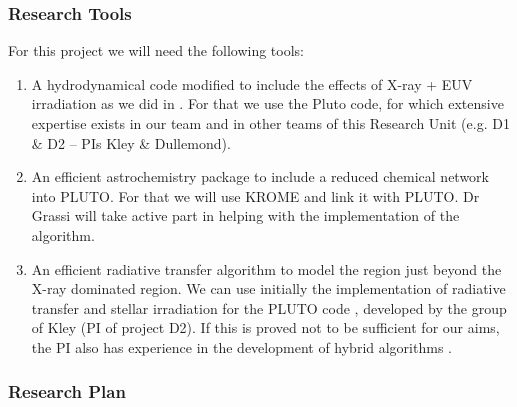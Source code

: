 \documentclass[10pt,fleqn,twoside]{article}
\begin{document}
\subsubsection{Research Tools}

For this project we will need the following tools: 
\begin{enumerate}
\item A hydrodynamical code modified to include the
  effects of X-ray + EUV irradiation as we did in 
  \citet{2010MNRAS.401.1415O}.
  For
  that we use the Pluto code, for which extensive expertise
  exists in our team and in other teams of this Research Unit (e.g. D1
  \& D2 -- PIs Kley \& Dullemond).
\item An efficient astrochemistry package to include a reduced
  chemical network into PLUTO. For that we will use KROME 
  \citep{2014MNRAS.439.2386G}  
and link it with PLUTO. Dr Grassi will take active part in helping
with the implementation of the algorithm.
\item An efficient radiative transfer algorithm to model the region
  just beyond the X-ray dominated region. We can use initially the
  implementation of radiative transfer and stellar irradiation
for the PLUTO code 
\citep{2013A&A...559A..80K},
developed by the group of Kley
(PI of project D2). If this is proved not to be sufficient for our
aims, the PI also has experience in the
development of hybrid algorithms  
\citep{2014ASSP...36..127O}.

\end{enumerate}

\subsubsection{Research Plan} 
\end{document}
